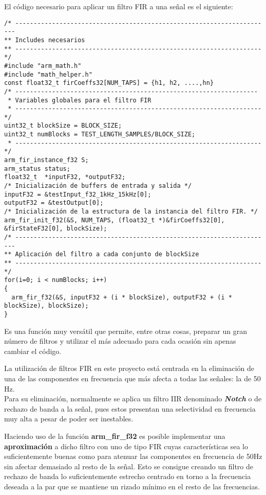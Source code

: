 El código necesario para aplicar un filtro FIR a una señal es el siguiente:

\begin{lstlisting}[label=algoritmo:STM_filtro,style = STM-code,frame=single,caption=Filtro FIR en STM]
/* ----------------------------------------------------------------------
** Includes necesarios
** ------------------------------------------------------------------- */
#include "arm_math.h"
#include "math_helper.h"
const float32_t firCoeffs32[NUM_TAPS] = {h1, h2, ....,hn}
/* ------------------------------------------------------------------
 * Variables globales para el filtro FIR
 * ------------------------------------------------------------------- */
uint32_t blockSize = BLOCK_SIZE;
uint32_t numBlocks = TEST_LENGTH_SAMPLES/BLOCK_SIZE;
 * ------------------------------------------------------------------- */
arm_fir_instance_f32 S;
arm_status status;
float32_t  *inputF32, *outputF32;
/* Inicialización de buffers de entrada y salida */
inputF32 = &testInput_f32_1kHz_15kHz[0];
outputF32 = &testOutput[0];
/* Inicialización de la estructura de la instancia del filtro FIR. */
arm_fir_init_f32(&S, NUM_TAPS, (float32_t *)&firCoeffs32[0], &firStateF32[0], blockSize);
/* ----------------------------------------------------------------------
** Aplicación del filtro a cada conjunto de blockSize
** ------------------------------------------------------------------- */
for(i=0; i < numBlocks; i++)
{
  arm_fir_f32(&S, inputF32 + (i * blockSize), outputF32 + (i * blockSize), blockSize);
}
\end{lstlisting}

Es una función muy versátil que permite, entre otras cosas, preparar un gran número de filtros y utilizar el más adecuado para cada ocasión sin apenas cambiar el código. 

La utilización de filtros FIR en este proyecto está centrada en la eliminación de una de las componentes en frecuencia que más afecta a todas las señales: la de 50 Hz.\\
Para su eliminación, normalmente se aplica un filtro IIR denominado \textit{\textbf{Notch}} o de rechazo de banda a la señal, pues estos presentan una selectividad en frecuencia muy alta a pesar de poder ser inestables. 

Haciendo uso de la función \textbf{arm\_fir\_f32} es posible implementar una \textbf{aproximación} a dicho filtro con uno de tipo \acrshort{FIR} cuyas características sea lo suficientemente buenas como para atenuar las componentes en frecuencia de 50Hz sin afectar demasiado al resto de la señal. Esto se consigue creando un filtro de rechazo de banda lo suficientemente estrecho centrado en torno a la frecuencia deseada a la par que se mantiene un rizado mínimo en el resto de las frecuencias.

